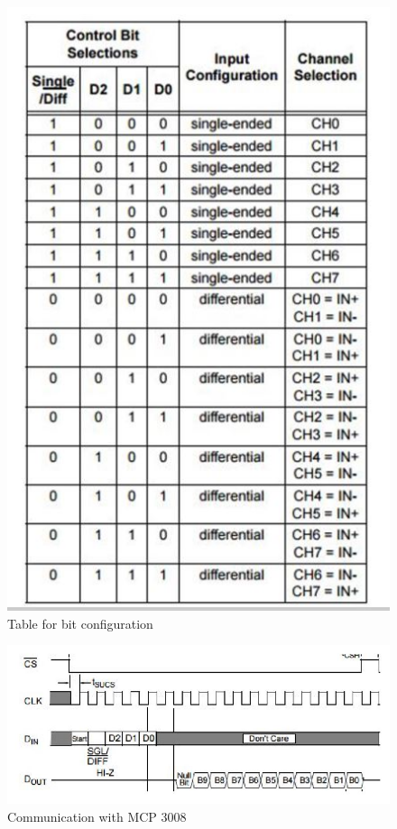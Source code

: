 \documentclass[11pt,a4paper]{article}
\begin{document}
	\begin{figure}[h!]
		\includegraphics[scale=0.7]{1.jpg}
		\centering
		\caption{Table for bit configuration}
	\end{figure}
		\begin{figure}[h!]
			\includegraphics[scale=0.7]{2.jpg}
			\centering
			\caption{Communication with MCP 3008}
		\end{figure}
\end{document}
